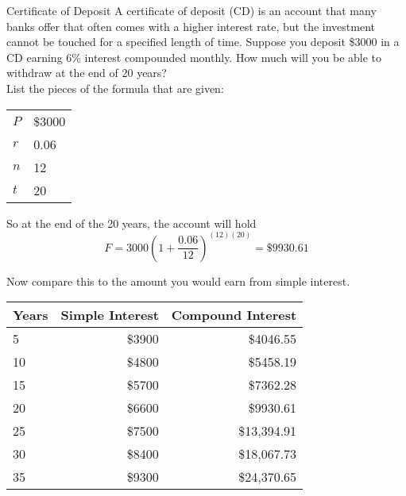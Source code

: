 \begin{example}[https://www.youtube.com/watch?v=UCQJgC0nRxA]{Certificate of Deposit}
A certificate of deposit (CD) is an account that many banks offer that often comes with a higher interest rate, but the investment cannot be touched for a specified length of time.  Suppose you deposit \$3000 in a CD earning 6\% interest compounded monthly.  How much will you be able to withdraw at the end of 20 years?\\

List the pieces of the formula that are given:
\begin{center}
\begin{tabular}{l l}
$P$ & \$3000\\
$r$ & 0.06\\
$n$ & 12\\
$t$ & 20
\end{tabular}
\end{center}
So at the end of the 20 years, the account will hold 
\[F = 3000\left(1+\dfrac{0.06}{12}\right)^{(12)(20)} = \$9930.61\]

Now compare this to the amount you would earn from simple interest.
\begin{center}
\begin{tabular}{l | r | r}
Years & Simple Interest & Compound Interest\\
\hline
5 & \$3900 & \$4046.55\\
10 & \$4800 & \$5458.19\\
15 & \$5700 & \$7362.28\\
20 & \$6600 & \$9930.61\\
25 & \$7500 & \$13,394.91\\
30 & \$8400 & \$18,067.73\\
35 & \$9300 & \$24,370.65
\end{tabular}
\end{center}
\pagebreak


\end{example}

